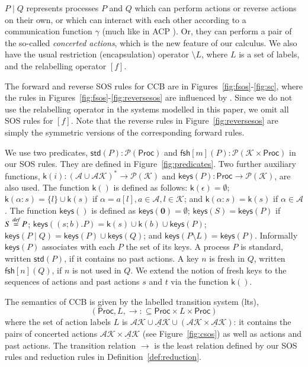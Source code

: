 \documentclass[review]{elsarticle}
\newcommand{\paral}{\; \vert \;}
\newcommand{\Proc}{\mathsf{Proc}}
\newcommand{\restrict}[1]{\!\setminus\!#1}
\newcommand{\mAK}{\mathcal{AK}}
\newcommand{\umAK}{\underline{\mathcal{A}}\mathcal{K}}
\newcommand{\Nil}{\mathbf{0}}
\newcommand{\std}[1]{\mathsf{std}(#1)}
\newcommand{\keys}[1]{\mathsf{keys}(#1)}
\newcommand{\kkey}[1]{\mathsf{k}(#1)}
\newcommand{\Keys}{\mathcal{K}}
\newcommand{\freshpred}[1]{\mathsf{fsh}[#1]}
\newcommand{\fresh}[2]{\mathsf{fsh}[#1](#2)}
\newcommand{\bydef}{\stackrel{\emph{def}}{=}}
\begin{document}
$P\paral Q$ represents processes $P$ and $Q$ which can perform actions or reverse actions on
their own, or which can interact with each other according to a communication function
$\gamma$ (much like in ACP \cite{BW90}). Or, they can perform a pair of the so-called \emph{concerted actions},
which is the new feature of our calculus.
We also have the usual restriction (encapsulation) operator
$\setminus L$, where $L$ is a set of labels, and the relabelling operator $[f]$.

The forward and reverse SOS rules for CCB are in 
Figures~\ref{fig:fsos}-\ref{fig:sc}, where
the rules in Figures~\ref{fig:fsos}-\ref{fig:reversesos}
are influenced by \cite{PhiUli07}. Since we do not use the relabelling operator in the systems modelled in 
this paper, we omit all SOS rules for $[f]$.
Note that the reverse rules in Figure~\ref{fig:reversesos}
are simply the symmetric versions of the corresponding forward rules. 

We use two predicates, $\std{P}:\mathcal{P}(\Proc)$ and $\fresh{m}{P}:\mathcal{P}(\Keys \times 
\Proc)$ in our SOS rules. They are defined in Figure~\ref{fig:predicates}. Two further auxiliary 
functions, 
$\kkey{i}: (\mathcal{A}\cup\mathcal{AK})^* \rightarrow \mathcal{P}(\Keys)$ and $\keys{P}: \Proc 
\rightarrow \mathcal{P}(\Keys)$, are also used. The function $\kkey{}$ is defined as follows:
$ \kkey{\epsilon}=\emptyset$;  $\kkey{\alpha:s}= \{l\}\cup\kkey{s}$ if $\alpha=a[l],a\in \mathcal{A},l \in \Keys$;
and $\kkey{\alpha:s}= \kkey{s}$ if $\alpha \in \mathcal{A}$.
The function $\keys{}$ is defined as $\keys{\Nil}=\emptyset$; $\keys{S}=\keys{P}$ if $S\bydef P$;
$\keys{(s;b).P}=\kkey{s} \cup \kkey{b} \cup \keys{P}$; 
$\keys{P \paral Q}= \keys{P} \cup \keys{Q}$; and $ \keys{P \restrict L}=\keys{P}$.
Informally $\keys{P}$ associates with each $P$ the set of its keys. A process $P$ is standard, 
written $\std{P}$, if it contains no past actions. A key $n$ is fresh in $Q$, written $\freshpred{n}(Q)$, 
if $n$ is not used in $Q$. We extend the notion of fresh keys to the sequences of actions and 
past actions $s$ and $t$ via the function $\kkey{}$.


The semantics of CCB is given by the labelled transition system (lts),
$$ (\Proc, L,\rightarrow: \subseteq \Proc \times L \times \Proc)$$
where the set of action labels $L$ is $\mAK \cup \umAK \cup (\mAK \times \umAK)$: it contains
the pairs of concerted actions $\mAK \times \umAK$ (see Figure~\ref{fig:csos}) as well as actions and past actions. 
The transition relation $\rightarrow$
is the least relation defined by our SOS rules and reduction rules in Definition~\ref{def:reduction}.
\end{document}
